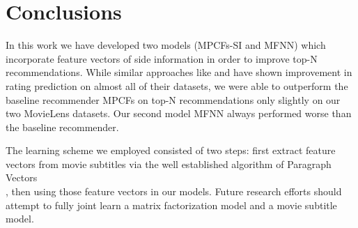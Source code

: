 \chapter{Conclusions}
\label{c:conclusions}

In this work we have developed two models (MPCFs-SI and MFNN) which incorporate feature vectors of side information in order to improve top-N recommendations.
While similar approaches like \cite{Bao2014} and \cite{Almahairi2015} have shown improvement in rating prediction on almost all of their datasets, we were able to outperform the baseline recommender MPCFs on top-N recommendations only slightly on our two MovieLens datasets.
Our second model MFNN always performed worse than the baseline recommender.

The learning scheme we employed consisted of two steps: first extract feature vectors from movie subtitles via the well established algorithm of Paragraph Vectors\\ \cite{Le2014a}, then using those feature vectors in our models.
Future research efforts should attempt to fully joint learn a matrix factorization model and a movie subtitle model.